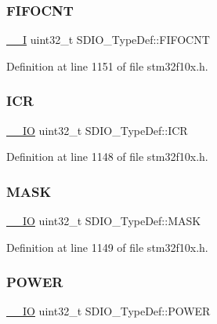 \subsubsection{\texorpdfstring{F\+I\+F\+O\+C\+NT}{FIFOCNT}}
{\footnotesize\ttfamily \hyperlink{core__sc300_8h_af63697ed9952cc71e1225efe205f6cd3}{\+\_\+\+\_\+I} uint32\+\_\+t S\+D\+I\+O\+\_\+\+Type\+Def\+::\+F\+I\+F\+O\+C\+NT}



Definition at line 1151 of file stm32f10x.\+h.

\mbox{\label{struct_s_d_i_o___type_def_ae3c052b85cc438d2b3069f99620e5139}} 
\subsubsection{\texorpdfstring{I\+CR}{ICR}}
{\footnotesize\ttfamily \hyperlink{core__sc300_8h_aec43007d9998a0a0e01faede4133d6be}{\+\_\+\+\_\+\+IO} uint32\+\_\+t S\+D\+I\+O\+\_\+\+Type\+Def\+::\+I\+CR}



Definition at line 1148 of file stm32f10x.\+h.

\mbox{\label{struct_s_d_i_o___type_def_a9a08e405ab985c60ff9031025ab37d31}} 
\subsubsection{\texorpdfstring{M\+A\+SK}{MASK}}
{\footnotesize\ttfamily \hyperlink{core__sc300_8h_aec43007d9998a0a0e01faede4133d6be}{\+\_\+\+\_\+\+IO} uint32\+\_\+t S\+D\+I\+O\+\_\+\+Type\+Def\+::\+M\+A\+SK}



Definition at line 1149 of file stm32f10x.\+h.

\mbox{\label{struct_s_d_i_o___type_def_a7c156bc55f6d970a846a459d57a9e940}} 
\subsubsection{\texorpdfstring{P\+O\+W\+ER}{POWER}}
{\footnotesize\ttfamily \hyperlink{core__sc300_8h_aec43007d9998a0a0e01faede4133d6be}{\+\_\+\+\_\+\+IO} uint32\+\_\+t S\+D\+I\+O\+\_\+\+Type\+Def\+::\+P\+O\+W\+ER}



